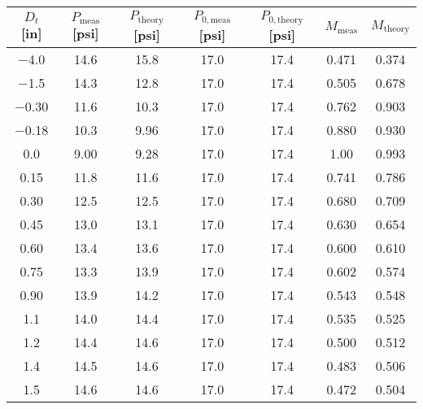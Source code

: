 \begin{tabular}{ccccccc}
\toprule
$D_t$ [\unit{in}] & $P_\text{meas}$ [\unit{psi}] & $P_\text{theory}$ [\unit{psi}] & $P_{0,\text{meas}}$ [\unit{psi}] & $P_{0,\text{theory}}$ [\unit{psi}] & $M_\text{meas}$ & $M_\text{theory}$ \\
\midrule
\num{-4.0} & \num{14.6} & \num{15.8} & \num{17.0} & \num{17.4} & \num{0.471} & \num{0.374} \\ 
\num{-1.5} & \num{14.3} & \num{12.8} & \num{17.0} & \num{17.4} & \num{0.505} & \num{0.678} \\ 
\num{-0.30} & \num{11.6} & \num{10.3} & \num{17.0} & \num{17.4} & \num{0.762} & \num{0.903} \\ 
\num{-0.18} & \num{10.3} & \num{9.96} & \num{17.0} & \num{17.4} & \num{0.880} & \num{0.930} \\ 
\num{0.0} & \num{9.00} & \num{9.28} & \num{17.0} & \num{17.4} & \num{1.00} & \num{0.993} \\ 
\num{0.15} & \num{11.8} & \num{11.6} & \num{17.0} & \num{17.4} & \num{0.741} & \num{0.786} \\ 
\num{0.30} & \num{12.5} & \num{12.5} & \num{17.0} & \num{17.4} & \num{0.680} & \num{0.709} \\ 
\num{0.45} & \num{13.0} & \num{13.1} & \num{17.0} & \num{17.4} & \num{0.630} & \num{0.654} \\ 
\num{0.60} & \num{13.4} & \num{13.6} & \num{17.0} & \num{17.4} & \num{0.600} & \num{0.610} \\ 
\num{0.75} & \num{13.3} & \num{13.9} & \num{17.0} & \num{17.4} & \num{0.602} & \num{0.574} \\ 
\num{0.90} & \num{13.9} & \num{14.2} & \num{17.0} & \num{17.4} & \num{0.543} & \num{0.548} \\ 
\num{1.1} & \num{14.0} & \num{14.4} & \num{17.0} & \num{17.4} & \num{0.535} & \num{0.525} \\ 
\num{1.2} & \num{14.4} & \num{14.6} & \num{17.0} & \num{17.4} & \num{0.500} & \num{0.512} \\ 
\num{1.4} & \num{14.5} & \num{14.6} & \num{17.0} & \num{17.4} & \num{0.483} & \num{0.506} \\ 
\num{1.5} & \num{14.6} & \num{14.6} & \num{17.0} & \num{17.4} & \num{0.472} & \num{0.504} \\ 
\bottomrule
\end{tabular}